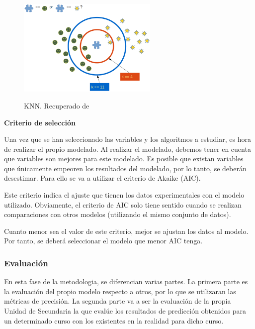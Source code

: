 \begin{enumerate}
	\begin{figure}[htb]
		\centering
		\caption{KNN. Recuperado de \protect{}}
		\includegraphics[width=0.6\textwidth]{recursos/k_NN}
		\label {fig:KNN}
	\end{figure}
	\FloatBarrier
	
	
\end{enumerate}

\textbf{Criterio de selección}

Una vez que se han seleccionado las variables y los algoritmos a estudiar, es hora de realizar el propio modelado. Al realizar el modelado, debemos tener en cuenta que variables son mejores para este modelado. Es posible que existan variables que únicamente empeoren los resultados del modelado, por lo tanto, se deberán desestimar. Para ello se va a utilizar el criterio de Akaike (AIC). 

Este criterio indica el ajuste que tienen los datos experimentales con el modelo utilizado. Obviamente, el criterio de AIC solo tiene sentido cuando se realizan comparaciones con otros modelos (utilizando el mismo conjunto de datos). \cite{martinez2009criterio}

Cuanto menor sea el valor de este criterio, mejor se ajustan los datos al modelo. Por tanto, se deberá seleccionar el modelo que menor AIC tenga. \cite{martinez2009criterio}

\subsubsection{Evaluación}
En esta fase de la metodologia, se diferencian varias partes. La primera parte es la evaluación del propio modelo respecto a otros, por lo que se utilizaran las métricas de precisión. La segunda parte va a ser la evaluación de la propia Unidad de Secundaria la que evalúe los resultados de predicción obtenidos para un determinado curso con los existentes en la realidad para dicho curso.

